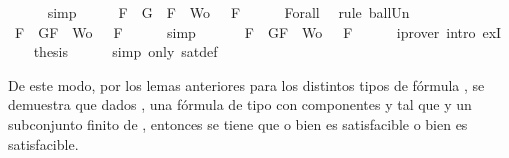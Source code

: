 \begin{isabellebody}
\ \ \ \ \isamarkupfalse%
\ simp\isanewline
\ \ \isamarkupfalse%
\ \isamarkupfalse%
\ {\isachardoublequoteopen}{\isasymforall}F\ {\isasymin}\ {\isacharparenleft}{\isacharbraceleft}G{\isacharbraceright}\ {\isasymunion}\ {\isacharparenleft}{\isacharbraceleft}F{\isacharbraceright}\ {\isasymunion}\ Wo{\isacharparenright}{\isacharparenright}{\isachardot}\ {\isasymA}\ {\isasymTurnstile}\ F{\isachardoublequoteclose}\isanewline
\ \ \ \ \isamarkupfalse%
\ Forall{}\ \isamarkupfalse%
\ {\isacharparenleft}rule\ ball{\isacharunderscore}Un{\isacharparenright}\isanewline
\ \ \isamarkupfalse%
\ \isamarkupfalse%
\ {\isachardoublequoteopen}{\isasymforall}F\ {\isasymin}\ {\isacharbraceleft}G{\isacharcomma}F{\isacharbraceright}\ {\isasymunion}\ Wo{\isachardot}\ {\isasymA}\ {\isasymTurnstile}\ F{\isachardoublequoteclose}\isanewline
\ \ \ \ \isamarkupfalse%
\ simp\isanewline
\ \ \isamarkupfalse%
\ \isamarkupfalse%
\ {\isachardoublequoteopen}{\isasymexists}{\isasymA}{\isachardot}\ {\isasymforall}F\ {\isasymin}\ {\isacharparenleft}{\isacharbraceleft}G{\isacharcomma}F{\isacharbraceright}\ {\isasymunion}\ Wo{\isacharparenright}{\isachardot}\ {\isasymA}\ {\isasymTurnstile}\ F{\isachardoublequoteclose}\isanewline
\ \ \ \ \isamarkupfalse%
\ {\isacharparenleft}iprover\ intro{\isacharcolon}\ exI{\isacharparenright}\isanewline
\ \ \isamarkupfalse%
\ {\isacharquery}thesis\isanewline
\ \ \ \ \isamarkupfalse%
\ {\isacharparenleft}simp\ only{\isacharcolon}\ sat{\isacharunderscore}def{\isacharparenright}\isanewline
{}\isamarkupfalse%
%
\endisatagproof
{\isafoldproof}%
%
\isadelimproof
%
\endisadelimproof
%
\begin{isamarkuptext}%
De este modo, por los lemas anteriores para los distintos tipos de fórmula \isa{{\isasymbeta}}, se
  demuestra que dados ,  una fórmula de tipo \isa{{\isasymbeta}} con componentes  y  tal que 
   y  un subconjunto finito de , entonces se tiene que o bien  es 
  satisfacible o bien  es satisfacible.%

\end{isamarkuptext}
\end{isabellebody}
